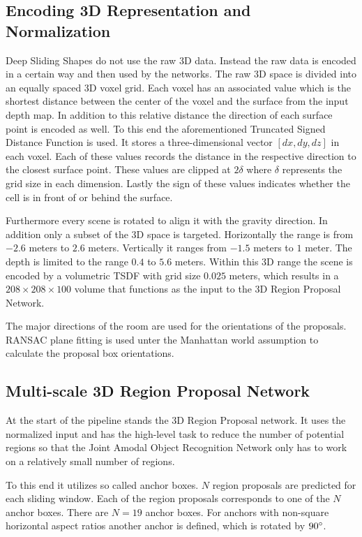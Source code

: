 \documentclass[12pt]{scrartcl}
\begin{document}
\subsection{Encoding 3D Representation and Normalization}

Deep Sliding Shapes do not use the raw 3D data. Instead the raw data is
encoded in a certain way and then used by the networks. The raw 3D space
is divided into an equally spaced 3D voxel grid. Each voxel has an associated
value which is the shortest distance between the center of the voxel and
the surface from the input depth map. In addition to this relative distance
the direction of each surface point is encoded as well. To this end the
aforementioned Truncated Signed Distance Function is used. It stores a
three-dimensional vector \([dx, dy, dz]\) in each voxel. Each of these
values records the distance in the respective direction to the closest
surface point. These values are clipped at \(2\delta\) where \(\delta\) represents
the grid size in each dimension. Lastly the sign of these values indicates
whether the cell is in front of or behind the surface.

Furthermore every scene is rotated to align it with the gravity direction.
In addition only a subset of the 3D space is targeted. Horizontally the range
is from \(-2.6\) meters to \(2.6\) meters. Vertically it ranges from \(-1.5\)
meters to \(1\) meter. The depth is limited to the range \(0.4\) to \(5.6\)
meters. Within this 3D range the scene is encoded by a volumetric TSDF with
grid size \(0.025\) meters, which results in a \(208 \times 208 \times 100\)
volume that functions as the input to the 3D Region Proposal Network.

The major directions of the room are used for the orientations of the proposals.
RANSAC plane fitting is used unter the Manhattan world assumption to calculate
the proposal box orientations.

\subsection{Multi-scale 3D Region Proposal Network}

At the start of the pipeline stands the 3D Region Proposal network. It uses the
normalized input and has the high-level task to reduce the number of potential
regions so that the Joint Amodal Object Recognition Network only has to work on
a relatively small number of regions.

To this end it utilizes so called anchor boxes. \(N\) region proposals are predicted
for each sliding window. Each of the region proposals corresponds to one of the
\(N\) anchor boxes. There are \(N = 19\) anchor boxes. For anchors with non-square
horizontal aspect ratios another anchor is defined, which is rotated by \(90 \degree\).
\end{document}
